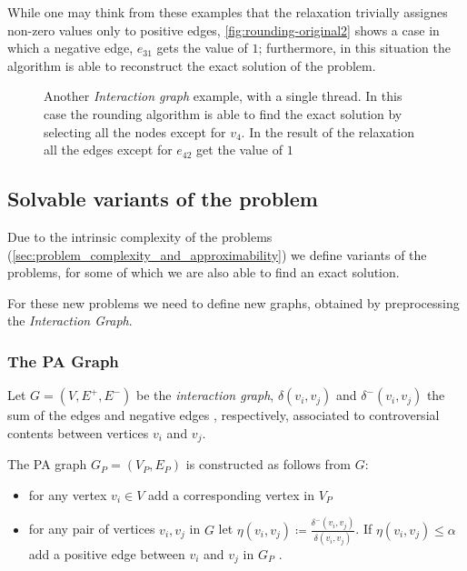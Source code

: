 While one may think from these examples that the relaxation trivially assignes
non-zero values only to positive edges, \autoref{fig:rounding-original2} shows
a case in which a negative edge, $e_{31}$ gets the value of $1$; furthermore,
in this situation the algorithm is able to reconstruct the exact solution of the problem.

\begin{figure}
	\centering
	\caption[Example of rounding algorithm finding the exact solution]{Another \emph{Interaction graph} example, with a single thread. In
		this case the rounding algorithm is able to find the exact solution by
		selecting all the nodes except for $v_4$. In the result of the
		relaxation all the edges except for $e_{42}$ get the value of $1$}%
	\label{fig:rounding-original2}
\end{figure}

\subsection{Solvable variants of the problem}%
\label{sub:solvable_variants_of_the_problem}

Due to the intrinsic complexity of the problems
(\autoref{sec:problem_complexity_and_approximability}) we define variants of
the problems, for some of which we are also able to find an exact solution.

For these new problems we need to define new graphs, obtained by preprocessing
the \emph{Interaction Graph}.

\subsubsection{The \acrlong{PA} Graph}%
\label{sub:pa-graph}

Let $G = (V, E^{+}, E^{-})$ be the \emph{interaction graph}, $\delta(v_{i}, v_{j})$ and
$\delta^{-} (v_{i}, v_{j})$ the sum of the edges and negative edges , respectively,
associated to controversial contents between vertices $v_{i} $ and $v_{j} $.

\bigskip

The \acrfull{PA} graph $G_P = (V_{P}, E_{P}) $ is constructed as follows from
$G$:

\begin{itemize}
	\item for any vertex $v_{i} \in V$ add a corresponding vertex in $V_{P} $
	\item for any pair of vertices $v_i, v_j$ in $G$ let $\eta(v_i,v_j)
		      \coloneqq \frac{\delta^{-} (v_i,v_j)}{\delta (v_i,v_j)} $. If
	      $\eta(v_i,v_j) \leq \alpha $ add a positive edge between $v_{i} $ and
	      $v_{j} $ in $G_{P} $ \footnotemark.
\end{itemize}

